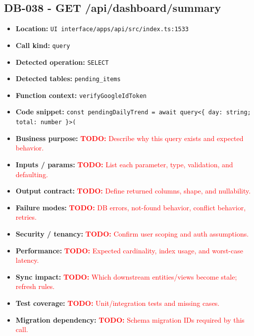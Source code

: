 \documentclass[11pt]{article}
\newcommand{\todoitem}[1]{\textcolor{red}{\textbf{TODO:} #1}}
\begin{document}
\subsection{DB-038 - GET /api/dashboard/summary}
\begin{itemize}[leftmargin=1.5em]
\item \textbf{Location:} \texttt{UI interface/apps/api/src/index.ts:1533}
\item \textbf{Call kind:} \texttt{query}
\item \textbf{Detected operation:} \texttt{SELECT}
\item \textbf{Detected tables:} \texttt{pending\_items}
\item \textbf{Function context:} \texttt{verifyGoogleIdToken}
\item \textbf{Code snippet:} \texttt{const pendingDailyTrend = await query<\{ day: string; total: number \}>(}
\item \textbf{Business purpose:} \todoitem{Describe why this query exists and expected behavior.}
\item \textbf{Inputs / params:} \todoitem{List each parameter, type, validation, and defaulting.}
\item \textbf{Output contract:} \todoitem{Define returned columns, shape, and nullability.}
\item \textbf{Failure modes:} \todoitem{DB errors, not-found behavior, conflict behavior, retries.}
\item \textbf{Security / tenancy:} \todoitem{Confirm user scoping and auth assumptions.}
\item \textbf{Performance:} \todoitem{Expected cardinality, index usage, and worst-case latency.}
\item \textbf{Sync impact:} \todoitem{Which downstream entities/views become stale; refresh rules.}
\item \textbf{Test coverage:} \todoitem{Unit/integration tests and missing cases.}
\item \textbf{Migration dependency:} \todoitem{Schema migration IDs required by this call.}
\end{itemize}
\end{document}
